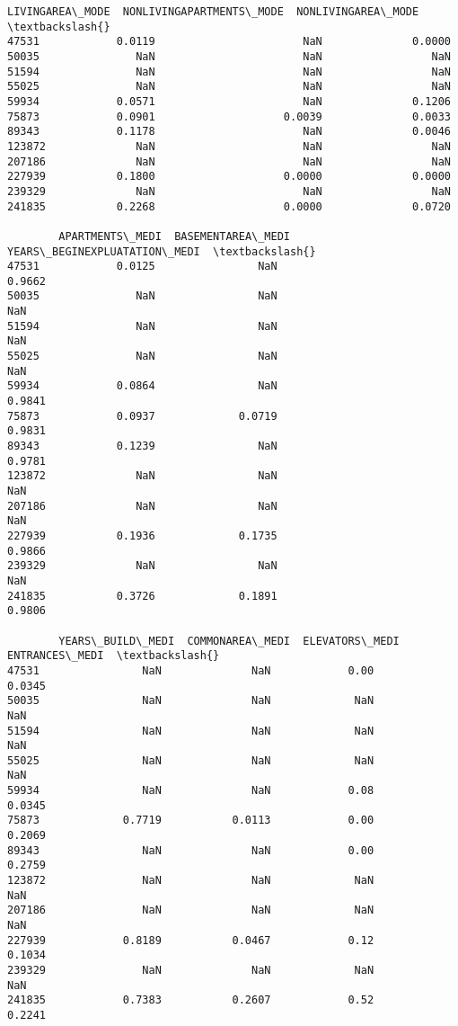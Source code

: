 \documentclass[11pt]{article}
\begin{document}
\begin{tcolorbox}[breakable, size=fbox, boxrule=.5pt, pad at break*=1mm, opacityfill=0]
\begin{Verbatim}[commandchars=\\\{\}]
        LIVINGAREA\_MODE  NONLIVINGAPARTMENTS\_MODE  NONLIVINGAREA\_MODE  \textbackslash{}
47531            0.0119                       NaN              0.0000
50035               NaN                       NaN                 NaN
51594               NaN                       NaN                 NaN
55025               NaN                       NaN                 NaN
59934            0.0571                       NaN              0.1206
75873            0.0901                    0.0039              0.0033
89343            0.1178                       NaN              0.0046
123872              NaN                       NaN                 NaN
207186              NaN                       NaN                 NaN
227939           0.1800                    0.0000              0.0000
239329              NaN                       NaN                 NaN
241835           0.2268                    0.0000              0.0720

        APARTMENTS\_MEDI  BASEMENTAREA\_MEDI  YEARS\_BEGINEXPLUATATION\_MEDI  \textbackslash{}
47531            0.0125                NaN                        0.9662
50035               NaN                NaN                           NaN
51594               NaN                NaN                           NaN
55025               NaN                NaN                           NaN
59934            0.0864                NaN                        0.9841
75873            0.0937             0.0719                        0.9831
89343            0.1239                NaN                        0.9781
123872              NaN                NaN                           NaN
207186              NaN                NaN                           NaN
227939           0.1936             0.1735                        0.9866
239329              NaN                NaN                           NaN
241835           0.3726             0.1891                        0.9806

        YEARS\_BUILD\_MEDI  COMMONAREA\_MEDI  ELEVATORS\_MEDI  ENTRANCES\_MEDI  \textbackslash{}
47531                NaN              NaN            0.00          0.0345
50035                NaN              NaN             NaN             NaN
51594                NaN              NaN             NaN             NaN
55025                NaN              NaN             NaN             NaN
59934                NaN              NaN            0.08          0.0345
75873             0.7719           0.0113            0.00          0.2069
89343                NaN              NaN            0.00          0.2759
123872               NaN              NaN             NaN             NaN
207186               NaN              NaN             NaN             NaN
227939            0.8189           0.0467            0.12          0.1034
239329               NaN              NaN             NaN             NaN
241835            0.7383           0.2607            0.52          0.2241


\end{Verbatim}
\end{tcolorbox}
\end{document}
